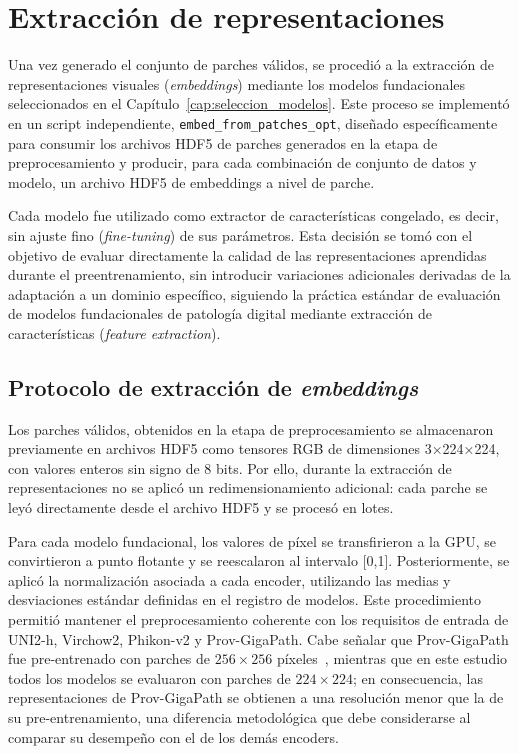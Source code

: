 \section{Extracción de representaciones}
\label{sec:extraccion_representaciones}

Una vez generado el conjunto de parches válidos, se
procedió a la extracción de representaciones visuales (\textit{embeddings})
mediante los modelos fundacionales seleccionados en el Capítulo~\ref{cap:seleccion_modelos}.
Este proceso se implementó en un script independiente,
\texttt{embed\_from\_patches\_opt}, diseñado específicamente para consumir los
archivos HDF5 de parches generados en la etapa de preprocesamiento y producir, para
cada combinación de conjunto de datos y modelo, un archivo HDF5 de embeddings a
nivel de parche.

Cada modelo fue utilizado como extractor de características congelado, es decir,
sin ajuste fino (\textit{fine-tuning}) de sus parámetros. Esta decisión se tomó con
el objetivo de evaluar directamente la calidad de las representaciones aprendidas
durante el preentrenamiento, sin introducir variaciones adicionales derivadas de la
adaptación a un dominio específico, siguiendo la práctica estándar de evaluación de
modelos fundacionales de patología digital mediante extracción de características
(\textit{feature extraction}).

\subsection{Protocolo de extracción de \textit{embeddings}}
\label{sec:protocolo-inferencia}

Los parches válidos, obtenidos en la etapa de preprocesamiento se almacenaron previamente en archivos HDF5 como tensores RGB de dimensiones 3×224×224, con valores enteros sin signo de 8 bits. Por ello, durante la extracción de representaciones no se aplicó un redimensionamiento adicional: cada parche se leyó directamente desde el archivo HDF5 y se procesó en lotes.

Para cada modelo fundacional, los valores de píxel se transfirieron a la GPU, se convirtieron a punto flotante y se reescalaron al intervalo [0,1]. Posteriormente, se aplicó la normalización asociada a cada encoder, utilizando las medias y desviaciones estándar definidas en el registro de modelos. Este procedimiento permitió mantener el preprocesamiento coherente con los requisitos de entrada de UNI2-h, Virchow2, Phikon-v2 y Prov-GigaPath. Cabe señalar que Prov-GigaPath fue pre-entrenado con parches de $256\times256$ píxeles~\parencite{xu2024provgigapath}, mientras que en este estudio todos los modelos se evaluaron con parches de $224\times224$; en consecuencia, las representaciones de Prov-GigaPath se obtienen a una resolución menor que la de su pre-entrenamiento, una diferencia metodológica que debe considerarse al comparar su desempeño con el de los demás encoders.

